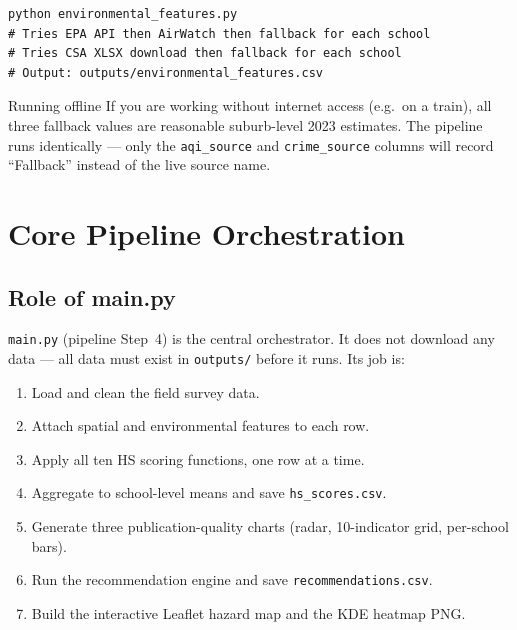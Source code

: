 \documentclass[11pt,a4paper,openany]{book}
\begin{document}
\begin{lstlisting}[style=bash, caption={Running the environmental features fetcher.}]
python environmental_features.py
# Tries EPA API then AirWatch then fallback for each school
# Tries CSA XLSX download then fallback for each school
# Output: outputs/environmental_features.csv
\end{lstlisting}

\begin{tipbox}{Running offline}
If you are working without internet access (e.g.\ on a train), all three fallback
values are reasonable suburb-level 2023 estimates.  The pipeline runs identically ---
only the \texttt{aqi\_source} and \texttt{crime\_source} columns will record
``Fallback'' instead of the live source name.
\end{tipbox}

\chapter{Core Pipeline Orchestration}

\section{Role of main.py}

\texttt{main.py} (pipeline Step~4) is the central orchestrator.  It does not download
any data --- all data must exist in \texttt{outputs/} before it runs.  Its job is:

\begin{enumerate}
  \item Load and clean the field survey data.
  \item Attach spatial and environmental features to each row.
  \item Apply all ten HS scoring functions, one row at a time.
  \item Aggregate to school-level means and save \texttt{hs\_scores.csv}.
  \item Generate three publication-quality charts (radar, 10-indicator grid, per-school bars).
  \item Run the recommendation engine and save \texttt{recommendations.csv}.
  \item Build the interactive Leaflet hazard map and the KDE heatmap PNG.
\end{enumerate}
\end{document}
